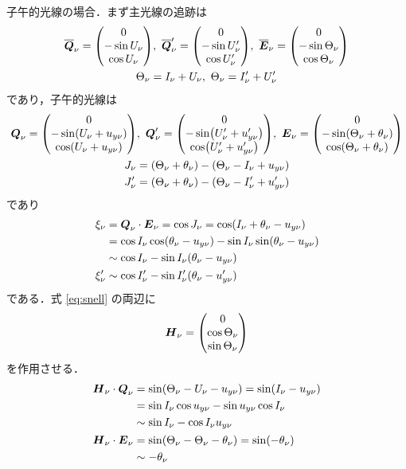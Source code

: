 \documentclass{jsarticle}
\begin{document}
子午的光線の場合．まず主光線の追跡は
\begin{gather}
    \overline{\vb*{Q}}_\nu=\mqty(0\\ -\sin U_\nu\\ \cos U_\nu),\ \overline{\vb*{Q}}_\nu'=\mqty(0\\ -\sin U_\nu'\\ \cos U_\nu'),\ \overline{\vb*{E}}_\nu=\mqty(0\\ -\sin \Theta_\nu\\ \cos \Theta_\nu)\\
    \Theta_\nu=I_\nu+U_\nu,\ \Theta_\nu=I_\nu'+U_\nu'
\end{gather}
であり，子午的光線は
\begin{gather}
    \vb*{Q}_\nu=\mqty(0\\ -\sin (U_\nu+u_{y\nu})\\ \cos (U_\nu+u_{y\nu})),\ \vb*{Q}_\nu'=\mqty(0\\ -\sin (U_\nu'+u_{y\nu}')\\ \cos (U_\nu'+u_{y\nu}')),\ \vb*{E}_\nu=\mqty(0\\ -\sin (\Theta_\nu+\theta_\nu)\\ \cos (\Theta_\nu+\theta_\nu))\\
    J_\nu=(\Theta_\nu+\theta_\nu)-(\Theta_\nu-I_\nu+u_{y\nu})\\
    J_\nu'=(\Theta_\nu+\theta_\nu)-(\Theta_\nu-I_\nu'+u_{y\nu}')
\end{gather}
であり
\begin{align}
    &\begin{aligned}
        \xi_\nu
        &=\vb*{Q}_\nu\cdot\vb*{E}_\nu=\cos J_\nu=\cos (I_\nu+\theta_\nu-u_{y\nu})\\
        &=\cos I_\nu \cos (\theta_\nu-u_{y\nu})-\sin I_\nu \sin (\theta_\nu-u_{y\nu})\\
        &\sim \cos I_\nu -\sin I_\nu (\theta_\nu-u_{y\nu})
    \end{aligned}\\
    & \xi_\nu'\sim \cos I_\nu' -\sin I_\nu' (\theta_\nu-u_{y\nu}')
\end{align}
である．式 \eqref{eq:snell} の両辺に
\begin{equation}
    \vb*{H}_\nu=\mqty(0\\ \cos \Theta_\nu\\ \sin \Theta_\nu)
\end{equation}
を作用させる．
\begin{align}
    &\begin{aligned}
        \vb*{H}_\nu\cdot\vb*{Q}_\nu&=\sin(\Theta_\nu-U_\nu-u_{y\nu})=\sin(I_\nu-u_{y\nu})\\
        &=\sin I_\nu\cos u_{y\nu}-\sin u_{y\nu}\cos I_\nu\\
        &\sim \sin I_\nu-\cos I_\nu u_{y\nu}
    \end{aligned}\\
    &\begin{aligned}
        \vb*{H}_\nu\cdot\vb*{E}_\nu&=\sin(\Theta_\nu-\Theta_\nu-\theta_\nu)=\sin(-\theta_\nu)\\
        &\sim -\theta_\nu
    \end{aligned}
\end{align}
\end{document}
